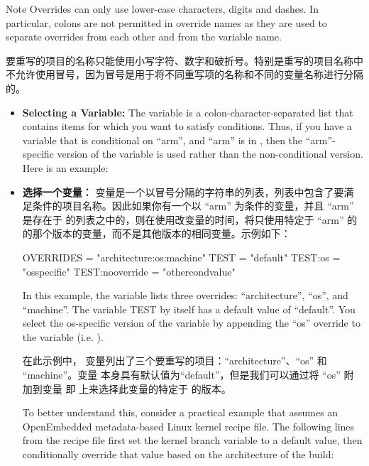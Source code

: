 \begin{noteblock}{Note}%
Overrides can only use lower-case characters, digits and dashes. In particular, colons are not permitted in override names as they are used to separate overrides from each other and from the variable name.

\medskip
要重写的项目的名称只能使用小写字符、数字和破折号。特别是重写的项目名称中不允许使用冒号，因为冒号是用于将不同重写项的名称和不同的变量名称进行分隔的。
\end{noteblock}

\begin{itemize}
\setlength\itemsep{1.0em}
\item \textbf{Selecting a Variable:} The  variable is a colon-character-separated list that contains items for which you want to satisfy conditions. Thus, if you have a variable that is conditional on ``arm'', and ``arm'' is in , then the ``arm''-specific version of the variable is used rather than the non-conditional version. Here is an example:

\item \textbf{选择一个变量：}  变量是一个以冒号分隔的字符串的列表，列表中包含了要满足条件的项目名称。因此如果你有一个以 ``arm'' 为条件的变量，并且 ``arm'' 是存在于  的列表之中的，则在使用改变量的时间，将只使用特定于 ``arm'' 的的那个版本的变量，而不是其他版本的相同变量。示例如下：

\begin{pyglist}
OVERRIDES = "architecture:os:machine"
TEST = "default"
TEST:os = "osspecific"
TEST:nooverride = "othercondvalue"
\end{pyglist}

In this example, the  variable lists three overrides: ``architecture'', ``os'', and ``machine''. The variable TEST by itself has a default value of ``default''. You select the os-specific version of the  variable by appending the ``os'' override to the variable (i.e. ).

\medskip
在此示例中， 变量列出了三个要重写的项目：``architecture''、``os'' 和 ``machine''。变量  本身具有默认值为``default''，但是我们可以通过将 ``os'' 附加到变量  即  上来选择此变量的特定于  的版本。

\medskip
To better understand this, consider a practical example that assumes an OpenEmbedded metadata-based Linux kernel recipe file. The following lines from the recipe file first set the kernel branch variable  to a default value, then conditionally override that value based on the architecture of the build:


\end{itemize}
